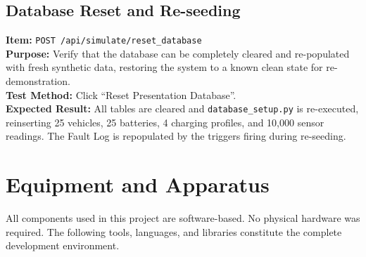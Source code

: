 \documentclass[12pt, a4paper]{report}
\begin{document}
\section{Database Reset and Re-seeding}
\textbf{Item:} \texttt{POST /api/simulate/reset\_database} \\
\textbf{Purpose:} Verify that the database can be completely cleared and re-populated with fresh synthetic data, restoring the system to a known clean state for re-demonstration. \\
\textbf{Test Method:} Click ``Reset Presentation Database''. \\
\textbf{Expected Result:} All tables are cleared and \texttt{database\_setup.py} is re-executed, reinserting 25 vehicles, 25 batteries, 4 charging profiles, and 10,000 sensor readings. The Fault Log is repopulated by the triggers firing during re-seeding.

\newpage

\chapter{Equipment and Apparatus}

All components used in this project are software-based. No physical hardware was required. The following tools, languages, and libraries constitute the complete development environment.
\end{document}
